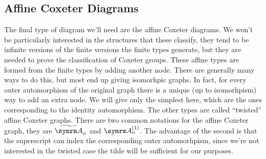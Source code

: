 \subsection{Affine Coxeter Diagrams}
The final type of diagram we'll need are the affine Coxeter diagrams.
We won't be particularly interested in the structures that these classify, they tend to be infinite versions of the finite versions the finite types generate, but they are needed to prove the classification of Coxeter groups.
These affine types are formed from the finite types by adding another node.
There are generally many ways to do this, but most end up giving isomorhpic graphs.
In fact, for every outer automorphism of the original graph there is a unique (up to isomorhpism) way to add an extra node.
We will give only the simplest here, which are the ones corresponding to the identity automorphism.
The other types are called \enquote{twisted} affine Coxeter graphs.
There are two common notations for the affine Coxeter graph, they are \(\affA[n]\) and \(\A[n]^{(1)}\).
The advantage of the second is that the superscript can index the corresponding outer automorhpism, since we're not interested in the twisted case the tilde will be sufficient for our purposes.

